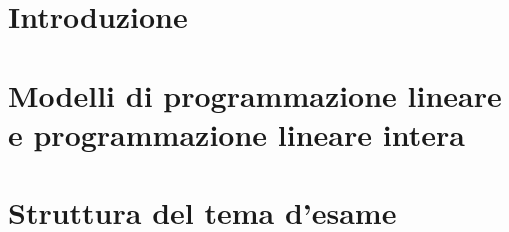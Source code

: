 \providecommand{\main}{.}








{\hypersetup{hidelinks}
  \tableofcontents  %
}

\chapter{Introduzione}


\chapter{Modelli di programmazione lineare e programmazione lineare intera}


%

\appendix
\chapter{Struttura del tema d'esame}




